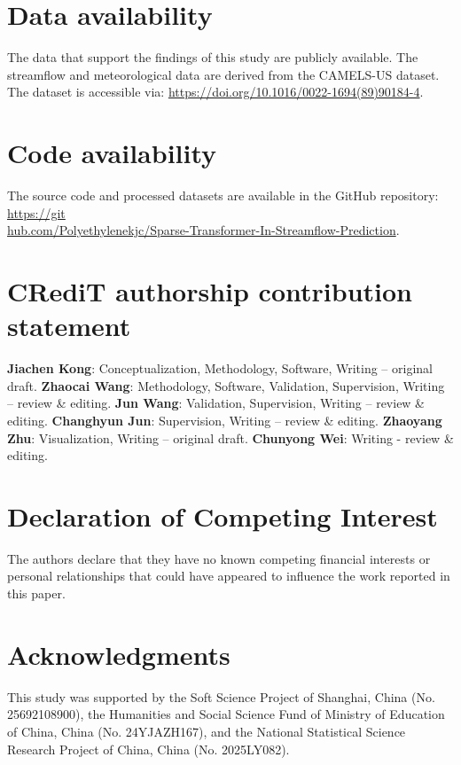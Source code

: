 \section*{Data availability}

The data that support the findings of this study are publicly available. The streamflow and meteorological data are derived from the CAMELS-US dataset\cite{CAMELS}. The dataset is accessible via: \href{https://doi.org/10.1016/0022-1694(89)90184-4}{https://doi.org/10.1016/0022-1694(89)90184-4}. 

\section*{Code availability}

The source code and processed datasets are available in the GitHub repository: \href{https://github.com/Polyethylenekjc/Sparse-Transformer-In-Streamflow-Prediction}{https://git\\hub.com/Polyethylenekjc/Sparse-Transformer-In-Streamflow-Prediction}.

\section*{CRediT authorship contribution statement}

\textbf{Jiachen Kong}: Conceptualization, Methodology, Software, Writing -- original draft.  
\textbf{Zhaocai Wang}: Methodology, Software, Validation, Supervision, Writing -- review \& editing.  
\textbf{Jun Wang}: Validation, Supervision, Writing -- review \& editing.  
\textbf{Changhyun Jun}: Supervision, Writing -- review \& editing.  
\textbf{Zhaoyang Zhu}: Visualization, Writing -- original draft.
\textbf{Chunyong Wei}: Writing - review \& editing.

\section*{Declaration of Competing Interest}

The authors declare that they have no known competing financial interests or personal relationships that could have appeared to influence the work reported in this paper.

\section*{Acknowledgments}
This study was supported by the Soft Science Project of Shanghai, China (No. 25692108900), the Humanities and Social Science Fund of Ministry of Education of China, China (No. 24YJAZH167), and the National Statistical Science Research Project of China, China (No. 2025LY082).


